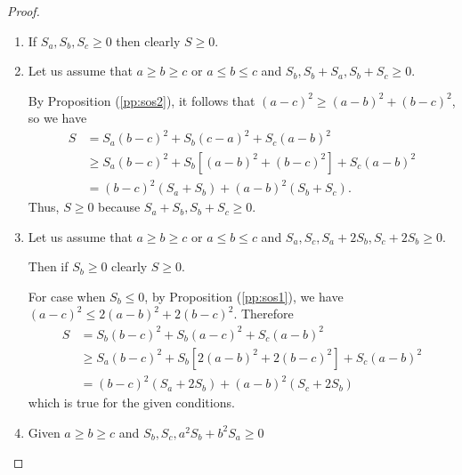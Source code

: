 \begin{proof}
  \begin{enumerate}
  \item If $S_a, S_b, S_c\geq 0$ then clearly $S\geq 0$.
  \item Let us assume that $a\geq b\geq c$ or $a\leq b\leq c$ and $S_b, S_b +
    S_a, S_b + S_c\geq 0$.

    \noindent By Proposition (\ref{pp:sos2}), it follows that $(a - c)^2 \geq (a
    - b)^2 + (b - c)^2$, so we have
    $$\begin{aligned}S &= S_a(b - c)^2 + S_b(c - a)^2 + S_c(a - b)^2\\&\geq S_a(b
      - c)^2 + S_b[(a - b)^2 + (b - c)^2] + S_c(a - b)^2\\&=(b - c)^2(S_a + S_b)
      + (a - b)^2(S_b + S_c).\end{aligned}$$
    Thus, $S\geq 0$ because $S_a + S_b, S_b + S_c\geq 0$.
    \item Let us assume that $a\geq b\geq c$ or $a\leq b\leq c$ and $S_a, S_c,
      S_a + 2S_b, S_c + 2S_b \geq 0$.

      \noindent Then if $S_b\geq 0$ clearly $S\geq 0$.

      \noindent For case when $S_b\leq 0$, by Proposition (\ref{pp:sos1}), we
      have $(a - c)^2 \leq 2(a - b)^2 + 2(b - c)^2$. Therefore
      $$\begin{aligned}S &= S_b(b - c)^2 + S_b(a - c)^2 + S_c(a - b)^2\\&\geq
        S_a(b - c)^2 + S_b[2(a - b)^2 + 2(b - c)^2] + S_c(a - b)^2\\&= (b -
        c)^2(S_a + 2S_b) + (a - b)^2(S_c + 2S_b)\end{aligned}$$
      which is true for the given conditions.
    \item Given $a\geq b\geq c$ and $S_b, S_c, a^2S_b + b^2S_a\geq 0$


\end{enumerate}
\end{proof}
